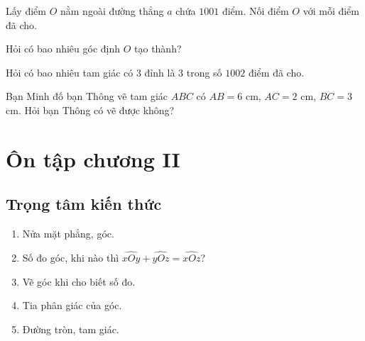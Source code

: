 \begin{bt}%
	Lấy điểm $O$ nằm ngoài đường thẳng $a$ chứa $1001$ điểm. Nối điểm $O$ với mỗi điểm đã cho. 
	\begin{listEX}
		\item Hỏi có bao nhiêu góc định $O$ tạo thành?
		\item Hỏi có bao nhiêu tam giác có $3$ đỉnh là $3$ trong số $1002$ điểm đã cho.
	\end{listEX}
\end{bt}
\begin{bt}%
	Bạn Minh đố bạn Thông vẽ tam giác $ABC$ có $AB=6$ cm, $AC=2$ cm, $BC=3$ cm. Hỏi bạn Thông có vẽ được không?
\end{bt}
\section{Ôn tập chương II}
\subsection{Trọng tâm kiến thức}
\begin{enumerate}[1.]
\item Nửa mặt phẳng, góc.
\item Số đo góc, khi nào thì $ \widehat{xOy}+\widehat{yOz}=\widehat{xOz} $?
\item Vẽ góc khi cho biết số đo.
\item Tia phân giác của góc.
\item Đường tròn, tam giác.
\end{enumerate}
